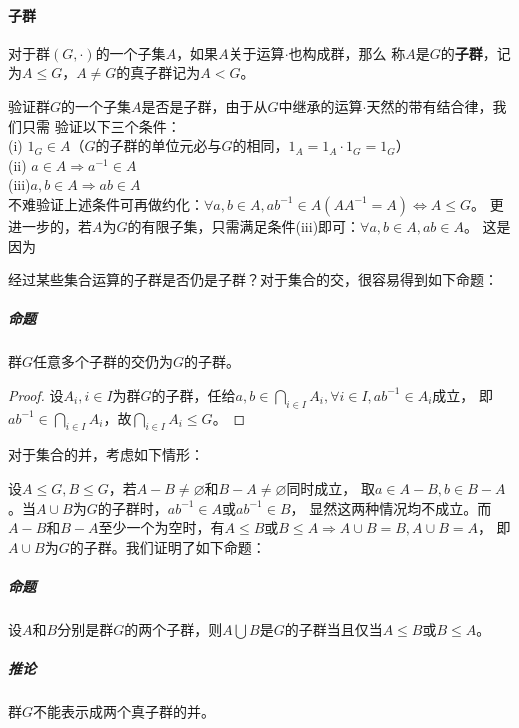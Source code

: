 \documentclass{article}
\begin{document}
\paragraph{子群} 对于群$(G,\cdot)$的一个子集$A$，如果$A$关于运算$\cdot$也构成群，那么
称$A$是$G$的\textbf{子群}，记为$A \leq G$，$A \neq G$的真子群记为$A < G$。

验证群$G$的一个子集$A$是否是子群，由于从$G$中继承的运算$\cdot$天然的带有结合律，我们只需
验证以下三个条件：\\
(i)  $1_G \in A$（$G$的子群的单位元必与$G$的相同，$1_A=1_A \cdot 1_G = 1_G$）\\
(ii) $a \in A \Rightarrow a^{-1} \in A$\\
(iii)$a,b \in A \Rightarrow ab \in A$\\
不难验证上述条件可再做约化：$\forall a,b \in A, ab^{-1} \in A(AA^{-1}=A) \Leftrightarrow A \leq G$。
更进一步的，若$A$为$G$的有限子集，只需满足条件(iii)即可：$\forall a,b \in A, ab \in A$。
这是因为

经过某些集合运算的子群是否仍是子群？对于集合的交，很容易得到如下命题：
\subparagraph{命题} 群$G$任意多个子群的交仍为$G$的子群。
\begin{proof}
    设$A_i,i \in I$为群$G$的子群，任给$a,b \in \mathop{\bigcap}\limits_{i \in I}A_i, \forall i \in I,ab^{-1} \in A_i$成立，
    即$ab^{-1} \in \mathop{\bigcap}\limits_{i \in I}A_i$，故$\mathop{\bigcap}\limits_{i \in I}A_i \leq G$。 
\end{proof}
对于集合的并，考虑如下情形：

   \def\radius{1cm}
   \def\ratio{0.6}
   \def\circleA{(180:\ratio*\radius) circle [radius=\radius]}
   \def\circleB{(0:\ratio*\radius) circle [radius=\radius]} 
\begin{center}
\end{center}
设$A \leq G,B \leq G$，若$A-B \neq \varnothing$和$B-A \neq \varnothing$同时成立，
取$a \in A-B,b \in B-A$。当$A \cup B$为$G$的子群时，$ab^{-1} \in A$或$ab^{-1} \in B$，
显然这两种情况均不成立。而$A-B$和$B-A$至少一个为空时，有$A \leq B$或$B \leq A \Rightarrow A \cup B=B, A \cup B=A$，
即$A \cup B$为$G$的子群。我们证明了如下命题：
\subparagraph{命题} 设$A$和$B$分别是群$G$的两个子群，则$A \bigcup B$是$G$的子群当且仅当$A \leq B$或$B \leq A$。
\subparagraph{推论} 群$G$不能表示成两个真子群的并。
\end{document}
